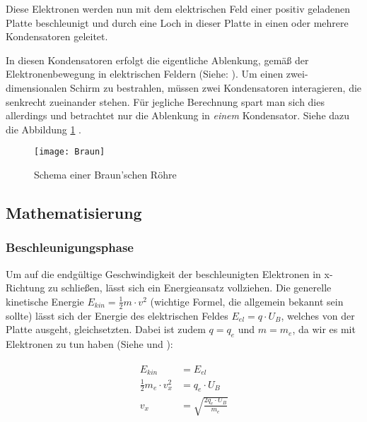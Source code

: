 Diese Elektronen werden nun mit dem elektrischen Feld einer positiv geladenen Platte beschleunigt und durch eine Loch in dieser Platte in einen oder mehrere Kondensatoren geleitet.

In diesen Kondensatoren erfolgt die eigentliche Ablenkung, gemäß der Elektronenbewegung in elektrischen Feldern (Siehe: ). Um einen zwei-dimensionalen Schirm zu bestrahlen, müssen zwei Kondensatoren interagieren, die senkrecht zueinander stehen. Für jegliche Berechnung spart man sich dies allerdings und betrachtet nur die Ablenkung in \emph{einem} Kondensator. Siehe dazu die Abbildung \ref{fig:BraunscheRoehre} .

\begin{figure}[h!] 
	\centering
	\texttt{[image: Braun]}
	\caption{Schema einer Braun'schen Röhre}
	\label{fig:BraunscheRoehre}
\end{figure}

\subsection{Mathematisierung}

\subsubsection{Beschleunigungsphase}

Um auf die endgültige Geschwindigkeit der beschleunigten Elektronen in x-Richtung zu schließen, lässt sich ein Energieansatz vollziehen. Die generelle kinetische Energie $E_{kin}=\frac{1}{2}m \cdot v^2$ (wichtige Formel, die allgemein bekannt sein sollte) lässt sich der Energie des elektrischen Feldes $E_{el}=q \cdot U_B$, welches von der Platte ausgeht, gleichsetzten. Dabei ist zudem $q = q_e$ und $m = m_e$, da wir es mit Elektronen zu tun haben (Siehe  und ):

\begin{align} \label{eq:BeschleunigungNachV}
\begin{split}
	E_{kin} &= E_{el} \\
	\frac{1}{2}m_e \cdot v_{x}^2 &= q_e \cdot U_B \\
	v_x &= \sqrt{\frac{2q_e \cdot U_B}{m_e}}
\end{split}
\end{align}

